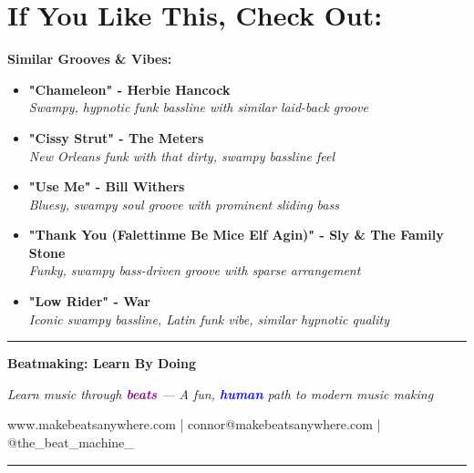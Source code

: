 \documentclass[11pt,letterpaper]{article}
\newcommand{\purple}[1]{\textcolor{purple}{\textbf{#1}}}
\newcommand{\bluepurple}[1]{\textcolor{blue}{\textbf{#1}}}
\begin{document}
\vspace{0.5cm}

\section*{If You Like This, Check Out:}

\begin{tcolorbox}[colback=blue!5,colframe=blue,width=\textwidth,arc=3mm,boxrule=1pt]
\textbf{Similar Grooves \& Vibes:}

\begin{itemize}[leftmargin=*, itemsep=0.3em]
\item \textbf{"Chameleon" - Herbie Hancock} \\
    \textit{Swampy, hypnotic funk bassline with similar laid-back groove}
\item \textbf{"Cissy Strut" - The Meters} \\
    \textit{New Orleans funk with that dirty, swampy bassline feel}
\item \textbf{"Use Me" - Bill Withers} \\
    \textit{Bluesy, swampy soul groove with prominent sliding bass}
\item \textbf{"Thank You (Falettinme Be Mice Elf Agin)" - Sly \& The Family Stone} \\
    \textit{Funky, swampy bass-driven groove with sparse arrangement}
\item \textbf{"Low Rider" - War} \\
    \textit{Iconic swampy bassline, Latin funk vibe, similar hypnotic quality}
\end{itemize}
\end{tcolorbox}

\vspace{1cm}

\begin{center}
\rule{0.8\textwidth}{0.5pt}

\vspace{0.3cm}

\textbf{Beatmaking: Learn By Doing}

\textit{Learn music through \purple{beats} — A fun, \bluepurple{human} path to modern music making}

\vspace{0.3cm}

\small www.makebeatsanywhere.com | connor@makebeatsanywhere.com | @the\_beat\_machine\_

\vspace{0.3cm}

\rule{0.8\textwidth}{0.5pt}
\end{center}
\end{document}
